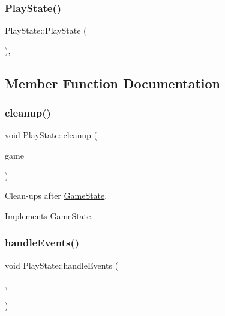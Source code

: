 \subsubsection{\texorpdfstring{PlayState()}{PlayState()}}
{\footnotesize\ttfamily Play\+State\+::\+Play\+State (\begin{DoxyParamCaption}{ }\end{DoxyParamCaption})\hspace{0.3cm}{\ttfamily [inline]}, {\ttfamily [protected]}}



\subsection{Member Function Documentation}
\mbox{\label{class_play_state_a047657388db62dc5a80b12147b0294b2}} 
\subsubsection{\texorpdfstring{cleanup()}{cleanup()}}
{\footnotesize\ttfamily void Play\+State\+::cleanup (\begin{DoxyParamCaption}\item[{\mbox{\hyperlink{class_game_engine}{Game\+Engine}} $\ast$}]{game }\end{DoxyParamCaption})\hspace{0.3cm}{\ttfamily [virtual]}}



Clean-\/ups after \mbox{\hyperlink{class_game_state}{Game\+State}}. 



Implements \mbox{\hyperlink{class_game_state_a7df4ea0b4815d2b3b35dbec2a399a0b6}{Game\+State}}.

\mbox{\label{class_play_state_acdb47d9367dac45893eb9c9a45390385}} 
\subsubsection{\texorpdfstring{handleEvents()}{handleEvents()}}
{\footnotesize\ttfamily void Play\+State\+::handle\+Events (\begin{DoxyParamCaption}\item[{\mbox{\hyperlink{class_game_engine}{Game\+Engine}} $\ast$}]{,  }\item[{sf\+::\+Event}]{ }\end{DoxyParamCaption})\hspace{0.3cm}{\ttfamily [virtual]}}



